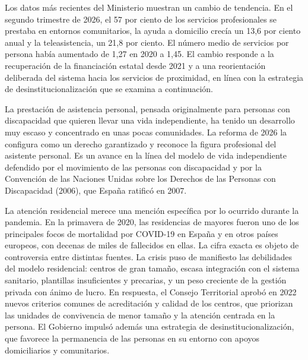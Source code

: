 \documentclass[10pt,a4paper]{article}
\begin{document}
Los datos más recientes del Ministerio muestran un cambio de tendencia. En el segundo trimestre de 2026, el 57 por ciento de los servicios profesionales se prestaba en entornos comunitarios, la ayuda a domicilio crecía un 13,6 por ciento anual y la teleasistencia, un 21,8 por ciento. El número medio de servicios por persona había aumentado de 1,27 en 2020 a 1,45. El cambio responde a la recuperación de la financiación estatal desde 2021 y a una reorientación deliberada del sistema hacia los servicios de proximidad, en línea con la estrategia de desinstitucionalización que se examina a continuación.

La prestación de asistencia personal, pensada originalmente para personas con discapacidad que quieren llevar una vida independiente, ha tenido un desarrollo muy escaso y concentrado en unas pocas comunidades. La reforma de 2026 la configura como un derecho garantizado y reconoce la figura profesional del asistente personal. Es un avance en la línea del modelo de vida independiente defendido por el movimiento de las personas con discapacidad y por la Convención de las Naciones Unidas sobre los Derechos de las Personas con Discapacidad (2006), que España ratificó en 2007.

La atención residencial merece una mención específica por lo ocurrido durante la pandemia. En la primavera de 2020, las residencias de mayores fueron uno de los principales focos de mortalidad por COVID-19 en España y en otros países europeos, con decenas de miles de fallecidos en ellas. La cifra exacta es objeto de controversia entre distintas fuentes. La crisis puso de manifiesto las debilidades del modelo residencial: centros de gran tamaño, escasa integración con el sistema sanitario, plantillas insuficientes y precarias, y un peso creciente de la gestión privada con ánimo de lucro. En respuesta, el Consejo Territorial aprobó en 2022 nuevos criterios comunes de acreditación y calidad de los centros, que priorizan las unidades de convivencia de menor tamaño y la atención centrada en la persona. El Gobierno impulsó además una estrategia de desinstitucionalización, que favorece la permanencia de las personas en su entorno con apoyos domiciliarios y comunitarios.
\end{document}
